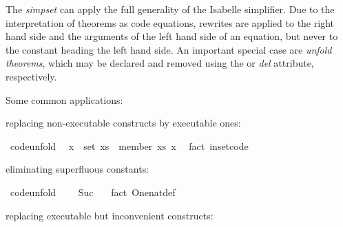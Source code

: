 \begin{isabellebody}
\begin{isamarkuptext}
  The \emph{simpset} can apply the full generality of the
  Isabelle simplifier.  Due to the interpretation of theorems as code
  equations, rewrites are applied to the right hand side and the
  arguments of the left hand side of an equation, but never to the
  constant heading the left hand side.  An important special case are
  \emph{unfold theorems},  which may be declared and removed using
  the \hyperlink{attribute.code-unfold}{\mbox{}} or \emph{\hyperlink{attribute.code-unfold}{\mbox{}} del}
  attribute, respectively.

  Some common applications:%
\end{isamarkuptext}%
\isamarkuptrue%
%
\begin{itemize}
%
\begin{isamarkuptext}%
\item replacing non-executable constructs by executable ones:%
\end{isamarkuptext}%
\isamarkuptrue%
%
\isadelimquote
%
\endisadelimquote
%
\isatagquote
{}\isamarkupfalse%
\ {\isacharbrackleft}code{\isacharunderscore}unfold{\isacharbrackright}{\isacharcolon}\isanewline
\ \ {\isachardoublequoteopen}x\ {\isasymin}\ set\ xs\ {\isasymlongleftrightarrow}\ member\ xs\ x{\isachardoublequoteclose}\ \isamarkupfalse%
\ {\isacharparenleft}fact\ in{\isacharunderscore}set{\isacharunderscore}code{\isacharparenright}%
\endisatagquote
{\isafoldquote}%
%
\isadelimquote
%
\endisadelimquote
%
\begin{isamarkuptext}%
\item eliminating superfluous constants:%
\end{isamarkuptext}%
\isamarkuptrue%
%
\isadelimquote
%
\endisadelimquote
%
\isatagquote
{}\isamarkupfalse%
\ {\isacharbrackleft}code{\isacharunderscore}unfold{\isacharbrackright}{\isacharcolon}\isanewline
\ \ {\isachardoublequoteopen}{}\ {\isacharequal}\ Suc\ {}{\isachardoublequoteclose}\ \isamarkupfalse%
\ {\isacharparenleft}fact\ One{\isacharunderscore}nat{\isacharunderscore}def{\isacharparenright}%
\endisatagquote
{\isafoldquote}%
%
\isadelimquote
%
\endisadelimquote
%
\begin{isamarkuptext}%
\item replacing executable but inconvenient constructs:%
\end{isamarkuptext}%
\isamarkuptrue%
%
\isadelimquote
%
\endisadelimquote
%
\isatagquote
{}\isamarkupfalse%

\end{itemize}
\end{isabellebody}
